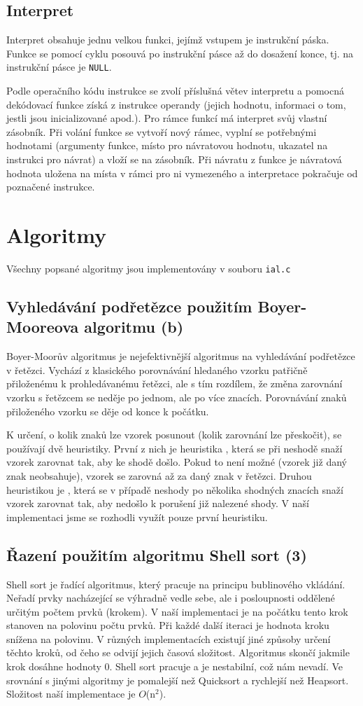\documentclass[a4paper, 11pt]{article}
\begin{document}
    \subsection{Interpret}
    Interpret obsahuje jednu velkou funkci, jejímž vstupem je instrukční páska. Funkce se pomocí cyklu posouvá po instrukční pásce až do dosažení konce, tj. na instrukční pásce je \texttt{NULL}.\par
    Podle operačního kódu instrukce se zvolí příslušná větev interpretu a pomocná dekódovací funkce získá z instrukce operandy (jejich hodnotu, informaci o tom, jestli jsou inicializované apod.). Pro rámce funkcí má interpret svůj vlastní zásobník. Při volání funkce se vytvoří nový rámec, vyplní se potřebnými hodnotami (argumenty funkce, místo pro návratovou hodnotu, ukazatel na instrukci pro návrat) a vloží se na zásobník. Při návratu z funkce je návratová hodnota uložena na místa v rámci pro ni vymezeného a interpretace pokračuje od poznačené instrukce.
    \section{Algoritmy}
    Všechny popsané algoritmy jsou implementovány v souboru \texttt{ial.c}
    \subsection{Vyhledávání podřetězce použitím Boyer-Mooreova algoritmu (b)}
	Boyer-Moorův algoritmus je nejefektivnější algoritmus na vyhledávání podřetězce v řetězci. Vychází z klasického porovnávání hledaného vzorku patřičně přiloženému k prohledávanému řetězci, ale s tím rozdílem, že změna zarovnání vzorku s řetězcem se neděje po jednom, ale po více znacích. Porovnávání znaků přiloženého vzorku se děje od konce k počátku.\par
	K určení, o kolik znaků lze vzorek posunout (kolik zarovnání lze přeskočit), se používají dvě heuristiky. První z nich je heuristika , která se při neshodě snaží vzorek zarovnat tak, aby ke shodě došlo. Pokud to není možné (vzorek již daný znak neobsahuje), vzorek se zarovná až za daný znak v řetězci. Druhou heuristikou je , která se v případě neshody po několika shodných znacích snaží vzorek zarovnat tak, aby nedošlo k porušení již nalezené shody. V naší implementaci jsme se rozhodli využít pouze první heuristiku.
    \subsection{Řazení použitím algoritmu Shell sort (3)}
    Shell sort je řadící algoritmus, který pracuje na principu bublinového vkládání. Neřadí prvky nacházející se výhradně vedle sebe, ale i posloupnosti oddělené určitým počtem prvků (krokem). V naší implementaci je na počátku tento krok stanoven na polovinu počtu prvků. Při každé další iteraci je hodnota kroku snížena na polovinu. V různých implementacích existují jiné způsoby určení těchto kroků, od čeho se odvijí jejich časová složitost. Algoritmus skončí jakmile krok dosáhne hodnoty 0. Shell sort pracuje  a je nestabilní, což nám nevadí. Ve srovnání s jinými algoritmy je pomalejší než Quicksort a rychlejší než Heapsort. Složitost naší implementace je $O$(n$^2$).
\end{document}
